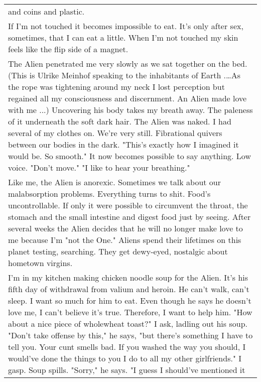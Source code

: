 \begin{longtable}[]{@{}l@{}}
\begin{minipage}[t]{0.97\columnwidth}
and coins and plastic.\strut
\end{minipage}\tabularnewline
\begin{minipage}[t]{0.97\columnwidth}\raggedright
If I'm not touched it becomes impossible to eat. It's only after sex,
sometimes, that I can eat a little. When I'm not touched my skin feels
like the flip side of a magnet.\strut
\end{minipage}\tabularnewline
\begin{minipage}[t]{0.97\columnwidth}\raggedright
The Alien penetrated me very slowly as we sat together on the bed. (This
is Ulrike Meinhof speaking to the inhabitants of Earth .\ldots{}As the
rope was tightening around my neck I lost perception but regained all my
consciousness and discernment. An Alien made love with me ...)
Uncovering his body takes my breath away. The paleness of it underneath
the soft dark hair. The Alien was naked. I had several of my clothes on.
We're very still. Fibrational quivers between our bodies in the dark.
"This's exactly how I imagined it would be. So smooth." It now becomes
possible to say anything. Low voice. "Don't move." "I like to hear your
breathing."\strut
\end{minipage}\tabularnewline
\begin{minipage}[t]{0.97\columnwidth}\raggedright
Like me, the Alien is anorexic. Sometimes we talk about our
malabsorption problems. Everything turns to shit. Food's uncontrollable.
If only it were possible to circumvent the throat, the stomach and the
small intestine and digest food just by seeing. After several weeks the
Alien decides that he will no longer make love to me because I'm "not
the One." Aliens spend their lifetimes on this planet testing,
searching. They get dewy-eyed, nostalgic about hometown virgins.\strut
\end{minipage}\tabularnewline
\begin{minipage}[t]{0.97\columnwidth}\raggedright
I'm in my kitchen making chicken noodle soup for the Alien. It's his
fifth day of withdrawal from valium and heroin. He can't walk, can't
sleep. I want so much for him to eat. Even though he says he doesn't
love me, I can't believe it's true. Therefore, I want to help him. "How
about a nice piece of wholewheat toast?" I ask, ladling out his soup.
"Don't take offense by this," he says, "but there's something I have to
tell you. Your cunt smells bad. If you washed the way you should, I
would've done the things to you I do to all my other girlfriends." I
gasp. Soup spills. "Sorry," he says. "I guess I should've mentioned it

\end{minipage}
\end{longtable}
